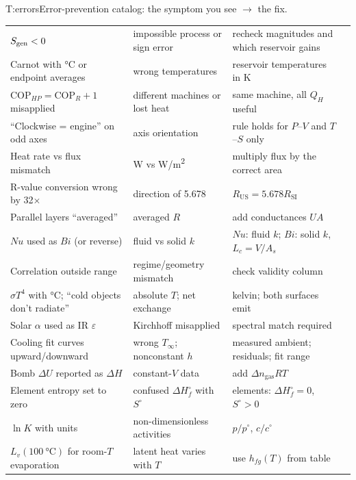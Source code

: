 \begin{reftab}{T:errors}{Error-prevention catalog: the symptom you see $\to$ the fix.}
\begin{tabularx}{\textwidth}{@{}L{0.27\textwidth}L{0.30\textwidth}Yr@{}}
$S_{\mathrm{gen}}<0$ & impossible process or sign error & recheck magnitudes and which reservoir gains & \\
Carnot with \si{\celsius} or endpoint averages & wrong temperatures & reservoir temperatures in K & \\
$\mathrm{COP}_{HP}=\mathrm{COP}_R+1$ misapplied & different machines or lost heat & same machine, all $Q_H$ useful & \\
``Clockwise = engine'' on odd axes & axis orientation & rule holds for $P$--$V$ and $T$--$S$ only & \\
Heat rate vs flux mismatch & \si{W} vs \si{W/m^2} & multiply flux by the correct area & \\
R-value conversion wrong by 32$\times$ & direction of 5.678 & $R_{\text{US}}=5.678R_{\text{SI}}$ & \\
Parallel layers ``averaged'' & averaged $R$ & add conductances $UA$ & \\
$Nu$ used as $Bi$ (or reverse) & fluid vs solid $k$ & $Nu$: fluid $k$; $Bi$: solid $k$, $L_c=V/A_s$ & \\
Correlation outside range & regime/geometry mismatch & check validity column & \\
$\sigma T^4$ with \si{\celsius}; ``cold objects don't radiate'' & absolute $T$; net exchange & kelvin; both surfaces emit & \\
Solar $\alpha$ used as IR $\varepsilon$ & Kirchhoff misapplied & spectral match required & \\
Cooling fit curves upward/downward & wrong $T_\infty$; nonconstant $h$ & measured ambient; residuals; fit range & \\
Bomb $\Delta U$ reported as $\Delta H$ & constant-$V$ data & add $\Delta n_{\text{gas}}RT$ & \\
Element entropy set to zero & confused $\Delta H_f^\circ$ with $S^\circ$ & elements: $\Delta H_f^\circ=0$, $S^\circ>0$ & \\
$\ln K$ with units & non-dimensionless activities & $p/p^\circ$, $c/c^\circ$ & \\
$L_v(\SI{100}{\celsius})$ for room-$T$ evaporation & latent heat varies with $T$ & use $h_{fg}(T)$ from table & \\
\bottomrule
\end{tabularx}\end{reftab}

